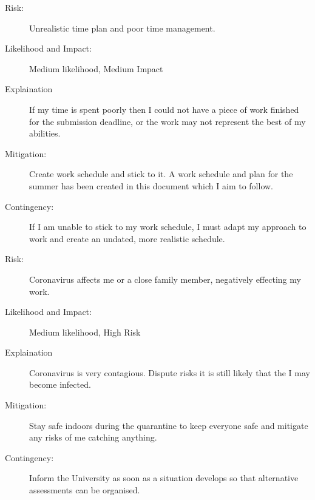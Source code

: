 \documentclass{article}
\begin{document}



\begin{description}
    \item[Risk:]    
    Unrealistic time plan and poor time management.
    \item[Likelihood and Impact:]
    Medium likelihood, Medium Impact
    \item[Explaination]
    If my time is spent poorly then I could not have a piece of work finished for the submission deadline, or the work may not represent the best of my abilities.  
    \item[Mitigation:]
    Create work schedule and stick to it.
    A work schedule and plan for the summer has been created in this document which I aim to follow.
    \item[Contingency:]
    If I am unable to stick to my work schedule, I must adapt my approach to work and create an undated, more realistic schedule.
\end{description}

\begin{description}
    \item[Risk:]
    Coronavirus affects me or a close family member, negatively effecting my work.    
    \item[Likelihood and Impact:]
    Medium likelihood, High Risk
    \item[Explaination]
    Coronavirus is very contagious. 
    Dispute risks it is still likely that the I may become infected. 
    \item[Mitigation:]
    Stay safe indoors during the quarantine to keep everyone safe and mitigate any risks of me catching anything.
    \item[Contingency:]
    Inform the University as soon as a situation develops so that alternative assessments can be organised.
\end{description}
\end{document}

